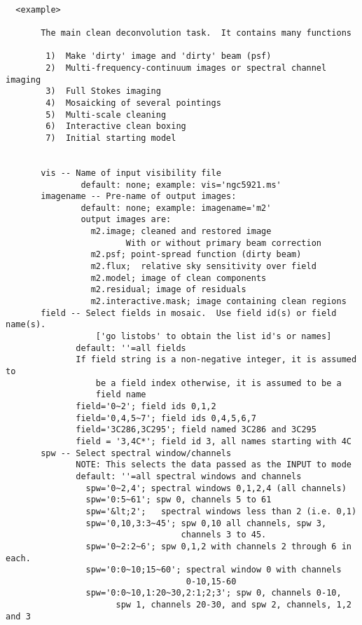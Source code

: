 \begin{verbatim}

  <example>

       The main clean deconvolution task.  It contains many functions
 
        1)  Make 'dirty' image and 'dirty' beam (psf)
        2)  Multi-frequency-continuum images or spectral channel imaging
        3)  Full Stokes imaging
        4)  Mosaicking of several pointings
        5)  Multi-scale cleaning
        6)  Interactive clean boxing
        7)  Initial starting model
 
 
       vis -- Name of input visibility file
               default: none; example: vis='ngc5921.ms'
       imagename -- Pre-name of output images:
               default: none; example: imagename='m2'
               output images are:
                 m2.image; cleaned and restored image
                        With or without primary beam correction
                 m2.psf; point-spread function (dirty beam)
                 m2.flux;  relative sky sensitivity over field
                 m2.model; image of clean components
                 m2.residual; image of residuals
                 m2.interactive.mask; image containing clean regions
       field -- Select fields in mosaic.  Use field id(s) or field name(s).
                  ['go listobs' to obtain the list id's or names]
              default: ''=all fields
              If field string is a non-negative integer, it is assumed to
                  be a field index otherwise, it is assumed to be a 
                  field name
              field='0~2'; field ids 0,1,2
              field='0,4,5~7'; field ids 0,4,5,6,7
              field='3C286,3C295'; field named 3C286 and 3C295
              field = '3,4C*'; field id 3, all names starting with 4C
       spw -- Select spectral window/channels
              NOTE: This selects the data passed as the INPUT to mode
              default: ''=all spectral windows and channels
                spw='0~2,4'; spectral windows 0,1,2,4 (all channels)
                spw='0:5~61'; spw 0, channels 5 to 61
                spw='&lt;2';   spectral windows less than 2 (i.e. 0,1)
                spw='0,10,3:3~45'; spw 0,10 all channels, spw 3, 
                                   channels 3 to 45.
                spw='0~2:2~6'; spw 0,1,2 with channels 2 through 6 in each.
                spw='0:0~10;15~60'; spectral window 0 with channels 
                                    0-10,15-60
                spw='0:0~10,1:20~30,2:1;2;3'; spw 0, channels 0-10,
                      spw 1, channels 20-30, and spw 2, channels, 1,2 and 3

\end{verbatim}
